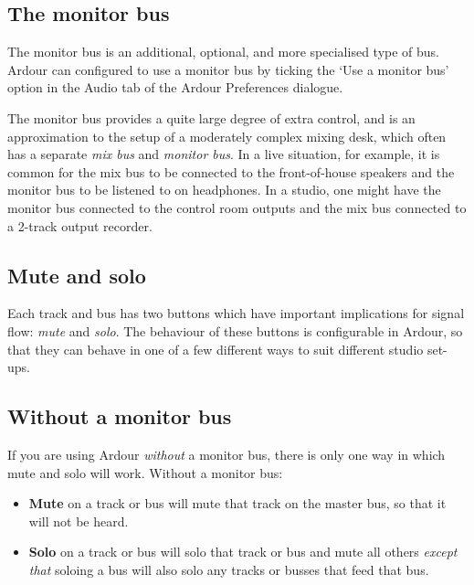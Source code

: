 \documentclass[10pt,a4paper]{book}
\newcommand{\dialogue}[1]{#1}
\newcommand{\tab}[1]{#1}
\begin{document}
\subsection{The monitor bus}

The monitor bus is an additional, optional, and more specialised type
of bus.  Ardour can configured to use a monitor bus by ticking the
`Use a monitor bus' option in the \tab{Audio} tab of the \dialogue{Ardour
  Preferences} dialogue.


The monitor bus provides a quite large degree of extra control, and is
an approximation to the setup of a moderately complex mixing desk,
which often has a separate \emph{mix bus} and \emph{monitor bus}.  In
a live situation, for example, it is common for the mix bus to be
connected to the front-of-house speakers and the monitor bus to be
listened to on headphones.  In a studio, one might have the monitor
bus connected to the control room outputs and the mix bus connected to
a 2-track output recorder.


\subsection{Mute and solo}
\label{sec:mute-and-solo}

Each track and bus has two buttons which have important implications
for signal flow: \emph{mute} and \emph{solo}.  The behaviour of these
buttons is configurable in Ardour, so that they can behave in one of a
few different ways to suit different studio set-ups.


\subsection{Without a monitor bus}

If you are using Ardour \emph{without} a monitor bus, there is only
one way in which mute and solo will work.  Without a monitor bus:

\begin{itemize}
\item \textbf{Mute} on a track or bus will mute that track on the
  master bus, so that it will not be heard.
\item \textbf{Solo} on a track or bus will solo that track or bus and
  mute all others \emph{except that} soloing a bus will also solo any
  tracks or busses that feed that bus.
\end{itemize}
\end{document}
